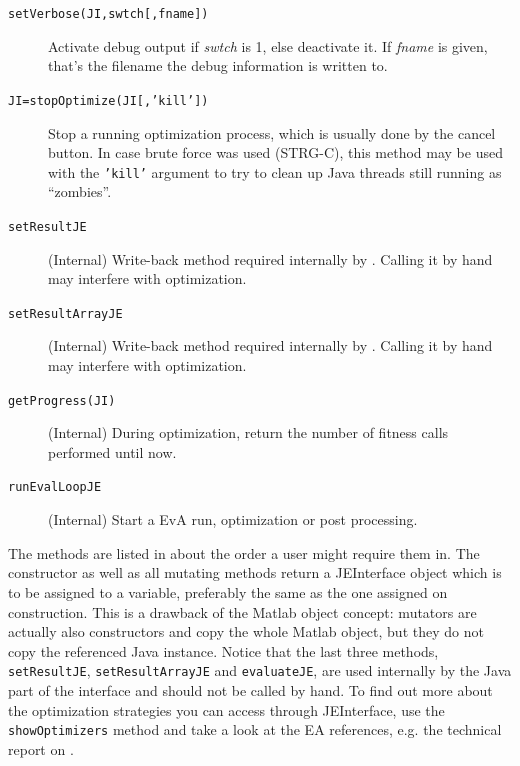 \begin{description}
	\item [{\texttt{setVerbose(JI,swtch{[},fname{]})}}] Activate debug output
if \emph{swtch} is 1, else deactivate it. If \emph{fname} is given,
that's the filename the debug information is written to.

	\item [{\texttt{JI=stopOptimize(JI{[},'kill'{]})}}] Stop a running optimization
process, which is usually done by the cancel button. In case brute
force was used (STRG-C), this method may be used with the \texttt{'kill'}
argument to try to clean up Java threads still running as ``zombies''.

	\item [{\texttt{setResultJE}}] (Internal) Write-back method required internally
by . Calling it by hand may interfere with optimization.

	\item [{\texttt{setResultArrayJE}}] (Internal) Write-back method required
internally by . Calling it by hand may interfere with optimization.

	\item [{\texttt{getProgress(JI)}}] (Internal) During optimization, return
the number of fitness calls performed until now.

	\item [{\texttt{runEvalLoopJE}}] (Internal) Start a EvA run, optimization
or post processing.
\end{description}
%
The methods are listed in about the order a user might require them
in. The constructor as well as all mutating methods return a JEInterface
object which is to be assigned to a variable, preferably the same
as the one assigned on construction. This is a drawback of the Matlab
object concept: mutators are actually also constructors and copy the
whole Matlab object, but they do not copy the referenced Java instance.
Notice that the last three methods, \texttt{setResultJE}, \texttt{setResultArrayJE}
and \texttt{evaluateJE}, are used internally by the Java part of the
interface and should not be called by hand. To find out more about
the optimization strategies you can access through JEInterface, use
the \texttt{showOptimizers} method and take a look at the EA references,
e.g. the technical report on  \cite{JOptDocumentation}. 

